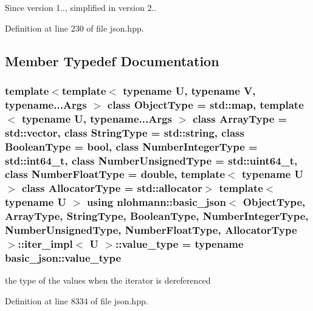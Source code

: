 \begin{DoxySince}{Since}
version 1.., simplified in version 2.. 
\end{DoxySince}


Definition at line 230 of file json.\+hpp.



\subsection{Member Typedef Documentation}
\hypertarget{classnlohmann_1_1basic__json_1_1iter__impl_a550cf393181e733bf76758a27e50422c}{}
\subsubsection[{value\+\_\+type}]{\setlength{\rightskip}{0pt plus 5cm}template$<$template$<$ typename U, typename V, typename...\+Args $>$ class Object\+Type = std\+::map, template$<$ typename U, typename...\+Args $>$ class Array\+Type = std\+::vector, class String\+Type  = std\+::string, class Boolean\+Type  = bool, class Number\+Integer\+Type  = std\+::int64\+\_\+t, class Number\+Unsigned\+Type  = std\+::uint64\+\_\+t, class Number\+Float\+Type  = double, template$<$ typename U $>$ class Allocator\+Type = std\+::allocator$>$ template$<$typename U $>$ using {\bf nlohmann\+::basic\+\_\+json}$<$ Object\+Type, Array\+Type, String\+Type, Boolean\+Type, Number\+Integer\+Type, Number\+Unsigned\+Type, Number\+Float\+Type, Allocator\+Type $>$\+::{\bf iter\+\_\+impl}$<$ U $>$\+::{\bf value\+\_\+type} =  typename {\bf basic\+\_\+json\+::value\+\_\+type}}\label{classnlohmann_1_1basic__json_1_1iter__impl_a550cf393181e733bf76758a27e50422c}


the type of the values when the iterator is dereferenced 



Definition at line 8334 of file json.\+hpp.

\hypertarget{classnlohmann_1_1basic__json_1_1iter__impl_a088519ca37ae2be2c1f1bbc4868dc878}{}
